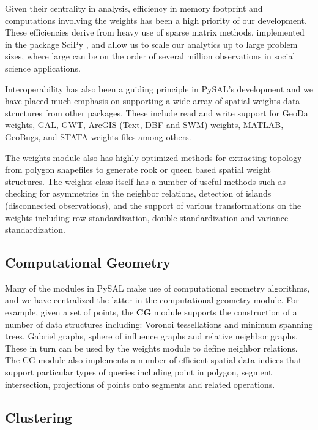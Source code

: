 \documentclass[11pt, titlepage]{amsart}
\begin{document}
Given their centrality in analysis, efficiency in memory footprint and
computations involving the weights has been a high priority of our
development. These efficiencies derive from heavy use of sparse matrix
methods, implemented in the package SciPy \citep{Oliphant:2007ul}, and
allow us to scale our analytics up to large problem sizes, where large
can be on the order of several million observations in social science
applications.

Interoperability has also been a guiding principle in PySAL's
development and we have placed much emphasis on supporting a wide array
of spatial weights data structures from other packages. These include
read and write support for GeoDa weights, GAL, GWT, ArcGIS (Text, DBF
and SWM) weights, MATLAB, GeoBugs, and STATA weights files among others.

The weights module also has highly optimized methods for extracting
topology from polygon shapefiles to generate rook or queen based spatial
weight structures. The weights class itself has a number of useful
methods such as checking for asymmetries in the neighbor relations,
detection of islands (disconnected observations), and the support of
various transformations on the weights including row standardization,
double standardization and variance standardization.

\subsection{Computational Geometry}

Many of the modules in PySAL make use of computational geometry
algorithms, and we have centralized the latter in the computational
geometry module. For example, given a set of points, the
\textbf{CG} module
supports the construction of a number of data structures including:
Voronoi tessellations and minimum spanning trees, Gabriel graphs, sphere
of influence graphs and relative neighbor graphs. These in turn can be
used by the weights module to define neighbor relations. The CG module
also implements a number of efficient spatial data indices that support
particular types of queries including point in polygon, segment
intersection, projections of points onto segments and related
operations.

\subsection{Clustering}
\end{document}

